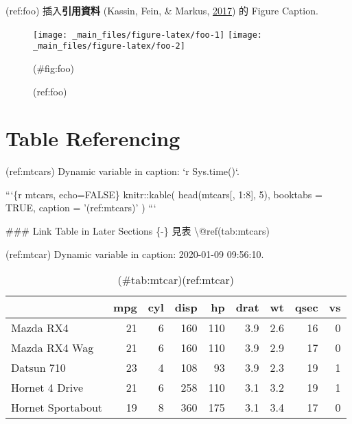 \documentclass[oneside]{book}
\newenvironment{Shaded}{\begin{snugshade}}{\end{snugshade}}
\newcommand{\BaseNTok}[1]{\textcolor[rgb]{0.00,0.00,0.81}{#1}}
\newcommand{\FunctionTok}[1]{\textcolor[rgb]{0.00,0.00,0.00}{#1}}
\newcommand{\NormalTok}[1]{#1}
\begin{document}
(ref:foo) 插入\textbf{引用資料} (Kassin, Fein, \& Markus, \protect\hyperlink{ref-kassin2017}{2017}) 的 Figure Caption.

\begin{figure}

{\centering \texttt{[image: \_main\_files/figure-latex/foo-1]} \texttt{[image: \_main\_files/figure-latex/foo-2]} 

}

\caption{(ref:foo)}(\#fig:foo)
\end{figure}

\hypertarget{table-referencing}{%
\section{Table Referencing}\label{table-referencing}}

\begin{Shaded}
\begin{Highlighting}[]
\NormalTok{(ref:mtcars) Dynamic variable in caption: }\BaseNTok{`r Sys.time()`}\NormalTok{.}

\BaseNTok{```\{r mtcars, echo=FALSE\}}
\BaseNTok{knitr::kable(}
\BaseNTok{  head(mtcars[, 1:8], 5), booktabs = TRUE,}
\BaseNTok{  caption = '(ref:mtcars)'}
\BaseNTok{  )}
\BaseNTok{```}

\FunctionTok{### Link Table in Later Sections \{-\}}
\NormalTok{見表 \textbackslash{}@ref(tab:mtcars)}
\end{Highlighting}
\end{Shaded}

(ref:mtcar) Dynamic variable in caption: 2020-01-09 09:56:10.

\begin{table}

\caption{(\#tab:mtcar)(ref:mtcar)}
\centering
\begin{tabular}[t]{lrrrrrrrr}
\toprule
  & mpg & cyl & disp & hp & drat & wt & qsec & vs\\
\midrule
Mazda RX4 & 21 & 6 & 160 & 110 & 3.9 & 2.6 & 16 & 0\\
Mazda RX4 Wag & 21 & 6 & 160 & 110 & 3.9 & 2.9 & 17 & 0\\
Datsun 710 & 23 & 4 & 108 & 93 & 3.9 & 2.3 & 19 & 1\\
Hornet 4 Drive & 21 & 6 & 258 & 110 & 3.1 & 3.2 & 19 & 1\\
Hornet Sportabout & 19 & 8 & 360 & 175 & 3.1 & 3.4 & 17 & 0\\
\bottomrule
\end{tabular}
\end{table}
\end{document}
